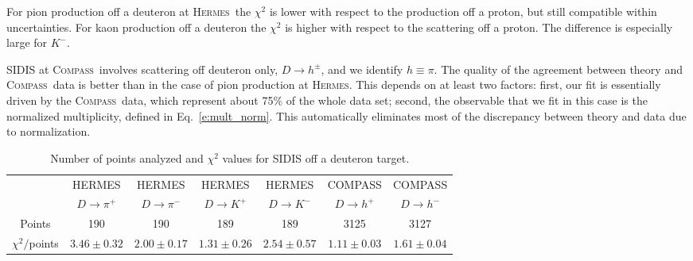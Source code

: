 \documentclass[aps,preprintnumbers,showpacs,nofootinbib,superscriptaddress,floatfix]{revtex4}
\newcommand{\hermes}{\textsc{Hermes}}
\newcommand{\compass}{\textsc{Compass}}
\begin{document}
For pion production off a deuteron at \hermes\ the $\chi^2$ is lower with
respect to the production off a proton, but still compatible within
uncertainties. For kaon production off a deuteron the $\chi^2$ is higher with
respect to the scattering off a proton. The difference is especially large for $K^-$. 

SIDIS at \compass\ involves scattering off deuteron only, $D \to h^\pm$, and we identify $h \equiv \pi$. 
The quality of the agreement between theory and \compass\ data is better than
in the case of pion production at \hermes. This depends on at least two
factors: first, our fit is essentially driven by the \compass\ data, which
represent about 75\% of the whole data set; second, the
observable that we fit in this case is the normalized
multiplicity, defined in Eq.~\eqref{e:mult_norm}. This automatically eliminates
most of the discrepancy between theory and data due to normalization. 
\begin{table}[h!]
\begin{center}
\begin{tabular}{|c|c|c|c|c|c|c|}
 \hline
\hline
  & HERMES & HERMES & HERMES & HERMES & COMPASS & COMPASS\\
 ~          &  $D \to \pi^+$    &   $D \to \pi^-$    &  $D \to K^+$    &   $D \to K^-$      &  $D \to h^+$    &   $D \to h^-$            \\
\hline
 Points         &  190 & 190 & 189 & 189   & 3125 & 3127   \\
 \hline
$\chi^2 /$points & $3.46\pm 0.32$ & $2.00\pm 0.17$ & $1.31\pm 0.26$ & $2.54\pm 0.57$  & $1.11\pm 0.03$ & $1.61\pm 0.04$ \\            
 \hline
 \hline
\end{tabular}
\caption{Number of points analyzed and $\chi^2$ values for SIDIS off a deuteron target.} 
\label{t:fl_ind_chi2_eD}
\end{center}
\end{table}


\end{document}
